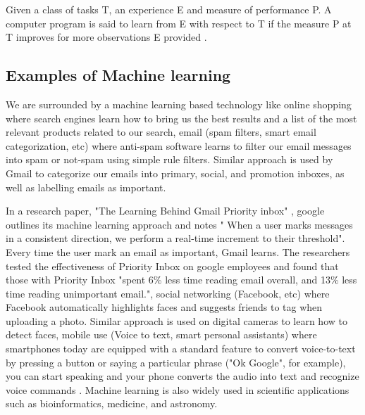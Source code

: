 Given a class of tasks T, an experience E and measure of performance P. A computer program is said to learn from E with respect to T if the measure P at T improves for more observations E provided \citep{michalski2013machine}. 
\subsection{Examples of Machine learning}
We are surrounded by a machine learning based technology like online shopping where  search engines learn how to bring us the best results and a list of the most relevant products related to our search, email (spam filters, smart email categorization, etc)  where anti-spam software
learns to filter our email messages into spam or not-spam using simple rule filters. Similar approach is used by Gmail to categorize our emails into primary, social, and promotion inboxes, as well as labelling emails as important. 

In a research paper, "The Learning Behind Gmail Priority inbox" \citep{aberdeen2010learning}, google outlines its machine learning approach  and notes " When a user marks messages in a consistent direction, we perform a real-time increment to their threshold". Every time the user mark an email as important, Gmail learns. The researchers tested the effectiveness of Priority Inbox on google employees and found that those with Priority Inbox "spent 6\% less time reading email overall, and 13\% less time reading unimportant email.", social networking (Facebook, etc) where Facebook  automatically highlights faces and suggests friends to tag when uploading a photo. Similar approach is used on digital cameras to learn how to detect faces,  mobile use (Voice to text, smart personal assistants)  where smartphones today are equipped with a standard feature to convert voice-to-text by pressing a button or saying a particular phrase ("Ok Google", for example), you can start speaking and your phone converts the audio into text and recognize voice commands \citep{Techemergence}.  
Machine learning is also widely used in scientific applications such as bioinformatics, medicine, and astronomy.


